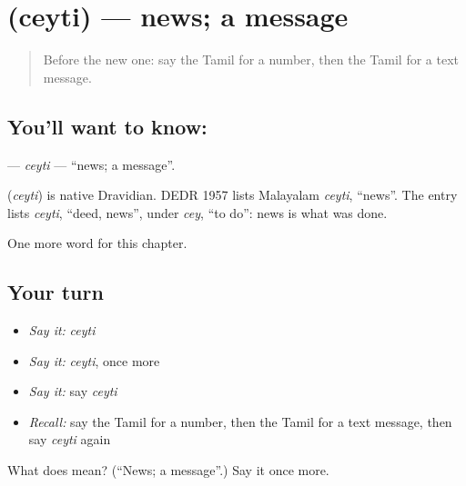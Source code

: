 \section[\texorpdfstring{\ta{செய்தி} (ceyti)}{செய்தி (ceyti)}]{ (ceyti) — news; a message}

\label{lesson:TA-C185-ceyti}



\begin{quote}
Before the new one: say the Tamil for a number, then the Tamil for a text message.
\end{quote}

\subsection*{You'll want to know: }
\textbf{} — \emph{ceyti} — \textquotedblleft{}news; a message\textquotedblright{}.

\begin{cousinweb}
\textbf{} (\emph{ceyti}) is native Dravidian. DEDR 1957 lists Malayalam \emph{ceyti}, \textquotedblleft{}news\textquotedblright{}. The entry lists \emph{ceyti}, \textquotedblleft{}deed, news\textquotedblright{}, under \emph{cey}, \textquotedblleft{}to do\textquotedblright{}: news is what was done.
\end{cousinweb}

\begin{grammarlens}[title={What you've built}]
One more word for this chapter.
\end{grammarlens}

\subsection*{Your turn}
\begin{itemize}
\raggedright
  \item \emph{Say it:} \emph{ceyti}
  \item \emph{Say it:} \emph{ceyti}, once more
  \item \emph{Say it:} say \emph{ceyti}
  \item \emph{Recall:} say the Tamil for a number, then the Tamil for a text message, then say \emph{ceyti} again
\end{itemize}

\begin{tcolorbox}[breakable,colback=teal!4,colframe=teal!35!black,title={Before you move on}]
What does  mean? (\textquotedblleft{}News; a message\textquotedblright{}.) Say it once more.
\end{tcolorbox}

